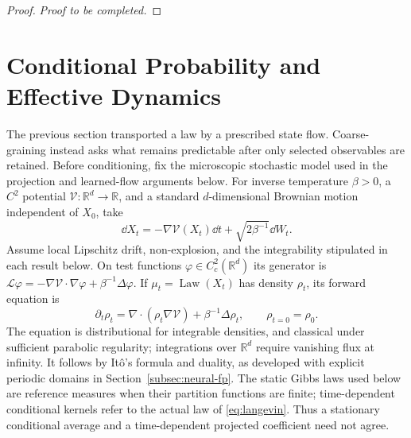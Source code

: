 \documentclass[12pt,a4paper,oneside]{book}
\begin{document}
\begin{proof}
\noindent\textit{Proof to be completed.}
\end{proof}



\section{Conditional Probability and Effective Dynamics}
\label{sec:conditional-dynamics}\label{ch:coarsegraining}

The previous section transported a law by a prescribed state flow. Coarse-graining instead asks what remains
predictable after only selected observables are retained. Before conditioning, fix the microscopic stochastic model
used in the projection and learned-flow arguments below. For inverse temperature $\beta>0$, a $C^2$ potential
$\mathcal V:\mathbb R^d\to\mathbb R$, and a standard $d$-dimensional Brownian motion independent of $X_0$, take
\begin{equation}
 \dd X_t=-\nabla\mathcal V(X_t)\dd t+\sqrt{2\beta^{-1}}\dd W_t.
 \label{eq:langevin}
\end{equation}
Assume local Lipschitz drift, non-explosion, and the integrability stipulated in each result below. On test functions
$\varphi\in C_c^2(\mathbb R^d)$ its generator is
$\mathcal L\varphi=-\nabla\mathcal V\cdot\nabla\varphi+\beta^{-1}\Delta\varphi$.
If $\mu_t=\operatorname{Law}(X_t)$ has density $\rho_t$, its forward equation is
\begin{equation}
 \partial_t\rho_t=\nabla\cdot(\rho_t\nabla\mathcal V)+\beta^{-1}\Delta\rho_t,
 \qquad \rho_{t=0}=\rho_0.
 \label{eq:fp}
\end{equation}
The equation is distributional for integrable densities, and classical under sufficient parabolic regularity;
integrations over $\mathbb R^d$ require vanishing flux at infinity. It follows by It\^o's formula and duality, as
developed with explicit periodic domains in Section~\ref{subsec:neural-fp}. The static Gibbs laws used below are
reference measures when their partition functions are finite; time-dependent conditional kernels refer to the
actual law of \eqref{eq:langevin}. Thus a stationary conditional average and a time-dependent projected coefficient
need not agree.
\end{document}
